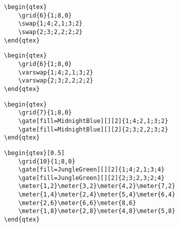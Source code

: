\documentclass[aps,prl,showpacs,notitlepage,floatfix,superscriptaddress,nofootinbib]{revtex4-2}
\begin{document}
\begin{Code}
\begin{qtex}
\end{qtex}
\tcblower
\begin{lstlisting}
\begin{qtex}
    \grid{6}{1;8,0}
    \swap{1;4;2,1;3;2}
    \swap{2;3;2,2;2;2}
\end{qtex}
\end{lstlisting}
\end{Code}

\begin{Code}
\begin{qtex}
\end{qtex}
\tcblower
\begin{lstlisting}
\begin{qtex}
    \grid{6}{1;8,0}
    \varswap{1;4;2,1;3;2}
    \varswap{2;3;2,2;2;2}
\end{qtex}
\end{lstlisting}
\end{Code}

\begin{Code}
\begin{qtex}
\end{qtex}
\tcblower
\begin{lstlisting}
\begin{qtex}
    \grid{7}{1;8,0}
    \gate[fill=MidnightBlue][][2]{1;4;2,1;3;2}
    \gate[fill=MidnightBlue][][2]{2;3;2,2;3;2}
\end{qtex}
\end{lstlisting}
\end{Code}

\begin{Code}
\begin{center}
\begin{qtex}[0.5]
\end{qtex}
\end{center}
\tcblower
\begin{lstlisting}
\begin{qtex}[0.5]
    \grid{10}{1;8,0}
    \gate[fill=JungleGreen][][2]{1;4;2,1;3;4}
    \gate[fill=JungleGreen][][2]{2;3;2,3;2;4}
    \meter{1,2}\meter{3,2}\meter{4,2}\meter{7,2}
    \meter{1,4}\meter{2,4}\meter{5,4}\meter{6,4}
    \meter{2,6}\meter{6,6}\meter{8,6}
    \meter{1,8}\meter{2,8}\meter{4,8}\meter{5,8}
\end{qtex}
\end{lstlisting}
\end{Code}
\end{document}
